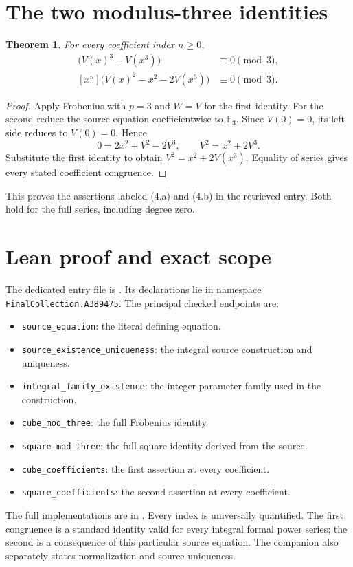 \documentclass[11pt,a4paper]{article}
\newtheorem{theorem}{Theorem}[section]
\theoremstyle{remark}
\newcommand{\F}{\mathbb F}
\begin{document}
\section{The two modulus-three identities}
\begin{theorem}
For every coefficient index $n\ge0$,
\begin{align*}
[x^n]\bigl(V(x)^3-V(x^3)\bigr)&\equiv0\pmod3,\\
[x^n]\bigl(V(x)^2-x^2-2V(x^3)\bigr)&\equiv0\pmod3.
\end{align*}
\end{theorem}
\begin{proof}
Apply Frobenius with $p=3$ and $W=V$ for the first identity.
For the second reduce the source equation coefficientwise to $\F_3$.
Since $V(0)=0$, its left side reduces to $V(0)=0$. Hence
\[
0=2x^2+V^2-2V^3,\qquad V^2=x^2+2V^3.
\]
Substitute the first identity to obtain $V^2=x^2+2V(x^3)$.
Equality of series gives every stated coefficient congruence.
\end{proof}
This proves the assertions labeled (4.a) and (4.b) in the retrieved
entry. Both hold for the full series, including degree zero.
\section{Lean proof and exact scope}
The dedicated entry file is . Its declarations lie in namespace \texttt{FinalCollection.A389475}. The principal checked endpoints are:
\begin{itemize}[nosep]
\item \texttt{source\_equation}: the literal defining equation.
\item \texttt{source\_existence\_uniqueness}: the integral source construction and uniqueness.
\item \texttt{integral\_family\_existence}: the integer-parameter family used in the construction.
\item \texttt{cube\_mod\_three}: the full Frobenius identity.
\item \texttt{square\_mod\_three}: the full square identity derived from the source.
\item \texttt{cube\_coefficients}: the first assertion at every coefficient.
\item \texttt{square\_coefficients}: the second assertion at every coefficient.
\end{itemize}
The full implementations are in .
Every index is universally quantified. The first congruence is a standard identity valid for every integral formal power series; the second is a consequence of this particular source equation. The companion also separately states normalization and source uniqueness.
\end{document}
